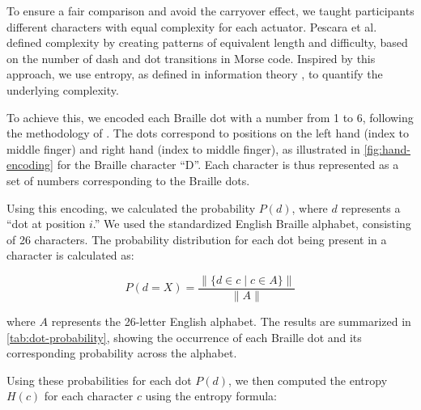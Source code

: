 To ensure a fair comparison and avoid the carryover effect, we taught participants different characters with equal complexity for each actuator. Pescara et al. \cite{Pescara2019} defined complexity by creating patterns of equivalent length and difficulty, based on the number of dash and dot transitions in Morse code. Inspired by this approach, we use entropy, as defined in information theory \cite{Gray2011, Shannon1948, Shannon2001}, to quantify the underlying complexity.

To achieve this, we encoded each Braille dot with a number from 1 to 6, following the methodology of \cite{Yang2017}. The dots correspond to positions on the left hand (index to middle finger) and right hand (index to middle finger), as illustrated in \autoref{fig:hand-encoding} for the Braille character \enquote{D}. Each character is thus represented as a set of numbers corresponding to the Braille dots.

Using this encoding, we calculated the probability \( P(d) \), where \( d \) represents a ``dot at position \( i \).'' We used the standardized English Braille alphabet, consisting of 26 characters. The probability distribution for each dot being present in a character is calculated as:

\[
P(d = X) = \frac{\|\{d \in c \mid c \in A\}\|}{\|A\|}
\]

where \( A \) represents the 26-letter English alphabet. The results are summarized in \autoref{tab:dot-probability}, showing the occurrence of each Braille dot and its corresponding probability across the alphabet.

\begin{table}[!ht]
\centering
{}
    \caption{Probability for each dot occurring.}
    \label{tab:dot-probability}
\end{table}

Using these probabilities for each dot \( P(d) \), we then computed the entropy \( H(c) \) for each character \( c \) using the entropy formula:

